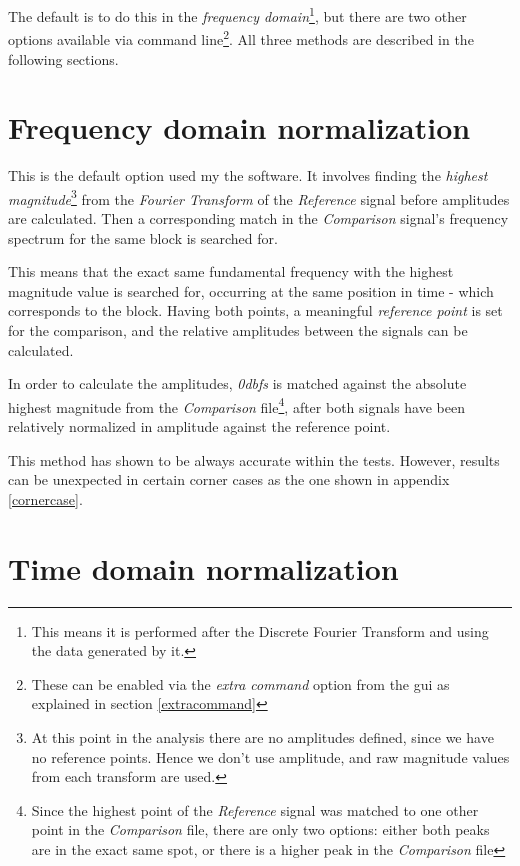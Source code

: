 \documentclass[10pt,a4paper]{report}
\newcommand{\db}[1]{\textit{#1\acrshort{dbfs}}}
\begin{document}
\begin{appendices}
The default is to do this in the \textit{frequency domain}\footnote{This means it is performed after the Discrete Fourier Transform and using the data generated by it.}, but there are two other options available via command line\footnote{These can be enabled via the \textit{extra command} option from the \acrshort{gui} as explained in section \ref{extracommand}}. All three methods are described in the following sections.

\section{Frequency domain normalization}

This is the default option used my the software. It involves finding the \textit{highest magnitude}\footnote{At this point in the analysis there are no amplitudes defined, since we have no reference points. Hence we don't use amplitude, and raw magnitude values from each transform are used.} from the \textit{Fourier Transform} of the \textit{Reference} signal before amplitudes are calculated. Then a corresponding match in the \textit{Comparison} signal's frequency spectrum for the same block is searched for. 

This means that the exact same fundamental frequency with the highest magnitude value is searched for, occurring at the same position in time - which corresponds to the block. Having both points, a meaningful \textit{reference point} is set for the comparison, and the relative amplitudes between the signals can be calculated.

In order to calculate the amplitudes, \db{0} is matched against the absolute highest magnitude from the \textit{Comparison} file\footnote{Since the highest point of the \textit{Reference} signal was matched to one other point in the \textit{Comparison} file, there are only two options: either both peaks are in the exact same spot, or there is a higher peak in the \textit{Comparison} file}, after both signals have been relatively normalized in amplitude against the reference point.

This method has shown to be always accurate within the tests. However, results can be unexpected in certain corner cases as the one shown in appendix \ref{cornercase}. 

\section{Time domain normalization}


\end{appendices}
\end{document}
